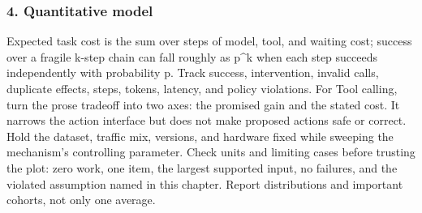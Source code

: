 \subsubsection*{4. Quantitative model}
Expected task cost is the sum over steps of model, tool, and waiting cost; success over a fragile k-step chain can fall roughly as p\textasciicircum{}k when each step succeeds independently with probability p. Track success, intervention, invalid calls, duplicate effects, steps, tokens, latency, and policy violations.
For Tool calling, turn the prose tradeoff into two axes: the promised gain and the stated cost. It narrows the action interface but does not make proposed actions safe or correct. Hold the dataset, traffic mix, versions, and hardware fixed while sweeping the mechanism's controlling parameter.
Check units and limiting cases before trusting the plot: zero work, one item, the largest supported input, no failures, and the violated assumption named in this chapter. Report distributions and important cohorts, not only one average.
